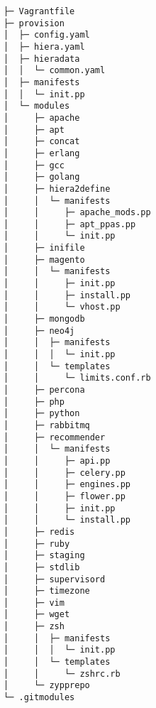 \begin{codebox}
\begin{verbatim}
├─ Vagrantfile
├─ provision
│  ├─ config.yaml
│  ├─ hiera.yaml
│  ├─ hieradata
│  │  └─ common.yaml
│  ├─ manifests
│  │  └─ init.pp
│  └─ modules
│     ├─ apache
│     ├─ apt
│     ├─ concat
│     ├─ erlang
│     ├─ gcc
│     ├─ golang
│     ├─ hiera2define
│     │  └─ manifests
│     │     ├─ apache_mods.pp
│     │     ├─ apt_ppas.pp
│     │     └─ init.pp
│     ├─ inifile
│     ├─ magento
│     │  └─ manifests
│     │     ├─ init.pp
│     │     ├─ install.pp
│     │     └─ vhost.pp
│     ├─ mongodb
│     ├─ neo4j
│     │  ├─ manifests
│     │  │  └─ init.pp
│     │  └─ templates
│     │     └─ limits.conf.rb
│     ├─ percona
│     ├─ php
│     ├─ python
│     ├─ rabbitmq
│     ├─ recommender
│     │  └─ manifests
│     │     ├─ api.pp
│     │     ├─ celery.pp
│     │     ├─ engines.pp
│     │     ├─ flower.pp
│     │     ├─ init.pp
│     │     └─ install.pp
│     ├─ redis
│     ├─ ruby
│     ├─ staging
│     ├─ stdlib
│     ├─ supervisord
│     ├─ timezone
│     ├─ vim
│     ├─ wget
│     ├─ zsh
│     │  ├─ manifests
│     │  │  └─ init.pp
│     │  └─ templates
│     │     └─ zshrc.rb
│     └─ zypprepo
└─ .gitmodules

\end{verbatim}
\end{codebox}

